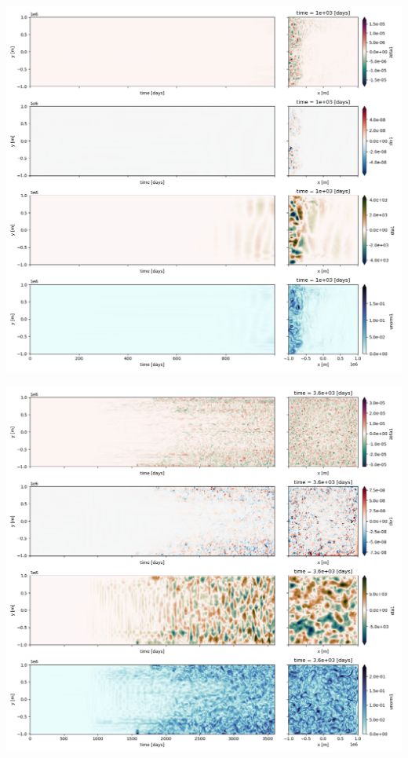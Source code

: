 \documentclass[10pt]{report}
\numberwithin{equation}{section}
\begin{document}
\begin{center}
\includegraphics[width=.9\linewidth]{figures/tests/2023-08-14_hovmoller1_t=1000days.png}
\end{center}
\begin{center}
\includegraphics[width=.9\linewidth]{figures/tests/2023-08-14_hovmoller1_t=3600days.png}
\end{center}
\end{document}
